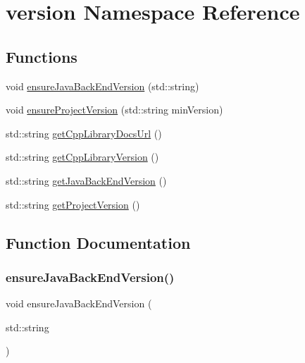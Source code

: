 \hypertarget{namespaceversion}{}\section{version Namespace Reference}
\label{namespaceversion}
\subsection*{Functions}
\begin{DoxyCompactItemize}
\item 
void \mbox{\hyperlink{namespaceversion_ae793ff0c00a2201b7955c77fe5772ff9}{ensure\+Java\+Back\+End\+Version}} (std\+::string)
\item 
void \mbox{\hyperlink{namespaceversion_a606841fea6a1e5b569bff25835044ef0}{ensure\+Project\+Version}} (std\+::string min\+Version)
\item 
std\+::string \mbox{\hyperlink{namespaceversion_a781a72e3d60cd90978b1cb82cd8fc90a}{get\+Cpp\+Library\+Docs\+Url}} ()
\item 
std\+::string \mbox{\hyperlink{namespaceversion_a5f0e87a859afd8a09a450e465a7e188b}{get\+Cpp\+Library\+Version}} ()
\item 
std\+::string \mbox{\hyperlink{namespaceversion_a9f1081a0730c20a978c3372cdb8639fe}{get\+Java\+Back\+End\+Version}} ()
\item 
std\+::string \mbox{\hyperlink{namespaceversion_a511c991ced04c44471064e36b90e6178}{get\+Project\+Version}} ()
\end{DoxyCompactItemize}


\subsection{Function Documentation}
\mbox{\label{namespaceversion_ae793ff0c00a2201b7955c77fe5772ff9}} 
\subsubsection{\texorpdfstring{ensure\+Java\+Back\+End\+Version()}{ensureJavaBackEndVersion()}}
{\footnotesize\ttfamily void ensure\+Java\+Back\+End\+Version (\begin{DoxyParamCaption}\item[{std\+::string}]{ }\end{DoxyParamCaption})}

